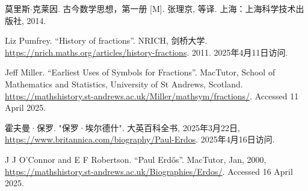莫里斯$\cdot$克莱因. 古今数学思想，第一册 [M]. 张理京, 等译. 上海：上海科学技术出版社, 2014. %

Liz Pumfrey. ``History of fractions''. NRICH, 剑桥大学. \url{https://nrich.maths.org/articles/history-fractions}. 2011. 2025年4月11日访问.


Jeff Miller. ``Earliest Uses of Symbols for Fractions''. MacTutor, School of Mathematics and Statistics, University of St Andrews, Scotland. \url{https://mathshistory.st-andrews.ac.uk/Miller/mathsym/fractions/}. Accessed 11 April 2025.

霍夫曼·保罗. "保罗·埃尔德什". 大英百科全书, 2025年3月22日, \url{https://www.britannica.com/biography/Paul-Erdos}. 2025年4月16日访问.


J J O'Connor and E F Robertson. ``Paul Erdős''. MacTutor, Jan, 2000, \url{https://mathshistory.st-andrews.ac.uk/Biographies/Erdos/}. Accessed 16 April 2025.
